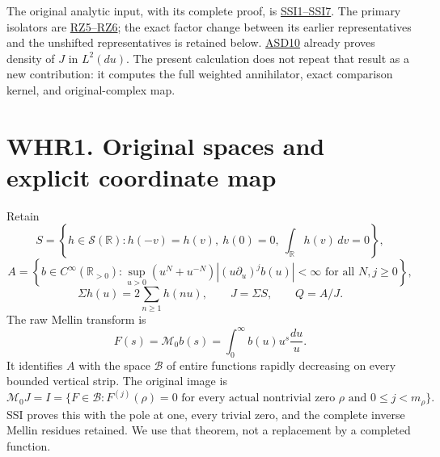 The original analytic input, with its complete proof, is
\href{https://github.com/KokunoYumeto/zeta-function-research-reader/blob/36a82ecca98addb8a98b48204e349737856c7223/workbenches/splitzero-tandem/continuations/20260924-cohomology-weight-and-character-lifts/geometric-positive-quotient/EXACT_SCHWARTZ_SUMMATION_IMAGE.md}{SSI1--SSI7}.
The primary isolators are
\href{https://github.com/KokunoYumeto/zeta-function-research-reader/blob/36a82ecca98addb8a98b48204e349737856c7223/workbenches/splitzero-tandem/continuations/20260924-cohomology-weight-and-character-lifts/gct-weight-control/proofs/ORIGINAL_ZETA_RESOLVENT_AND_PROJECTORS.md}{RZ5--RZ6};
the exact factor change between its earlier representatives and the
unshifted representatives is retained below.
\href{https://github.com/KokunoYumeto/zeta-function-research-reader/blob/36a82ecca98addb8a98b48204e349737856c7223/workbenches/splitzero-tandem/continuations/20260924-cohomology-weight-and-character-lifts/original-character-lifting/tau_lifting_weights_20260924/ACTUAL_SUPPORTED_DUALITY_INDEPENDENT.md}{ASD10}
already proves density of \(J\) in \(L^2(du)\). The present calculation
does not repeat that result as a new contribution: it computes the full
weighted annihilator, exact comparison kernel, and original-complex map.

\section{WHR1. Original spaces and explicit coordinate
map}\label{whr1.-original-spaces-and-explicit-coordinate-map}

Retain \[
 S=\left\{h\in\mathcal S(\mathbb R):h(-v)=h(v),\ h(0)=0,
              \ \int_{\mathbb R}h(v)\,dv=0\right\},
\] \[
 A=\left\{b\in C^\infty(\mathbb R_{>0}):
 \sup_{u>0}(u^N+u^{-N})|(u\partial_u)^jb(u)|<\infty
 \text{ for all }N,j\geq0\right\},
\] \[
 \Sigma h(u)=2\sum_{n\geq1}h(nu),\qquad J=\Sigma S,
 \qquad Q=A/J.
 \tag{WHR1.1}
\] The raw Mellin transform is \[
 F(s)=\mathcal M_0b(s)=\int_0^\infty b(u)u^s\frac{du}{u}.
 \tag{WHR1.2}
\] It identifies \(A\) with the space \(\mathcal B\) of entire functions
rapidly decreasing on every bounded vertical strip. The original image
is \[
 \mathcal M_0J=I=\{F\in\mathcal B:
 F^{(j)}(\rho)=0\text{ for every actual nontrivial zero }\rho
 \text{ and }0\leq j<m_\rho\}.
 \tag{WHR1.3}
\] SSI proves this with the pole at one, every trivial zero, and the
complete inverse Mellin residues retained. We use that theorem, not a
replacement by a completed function.

